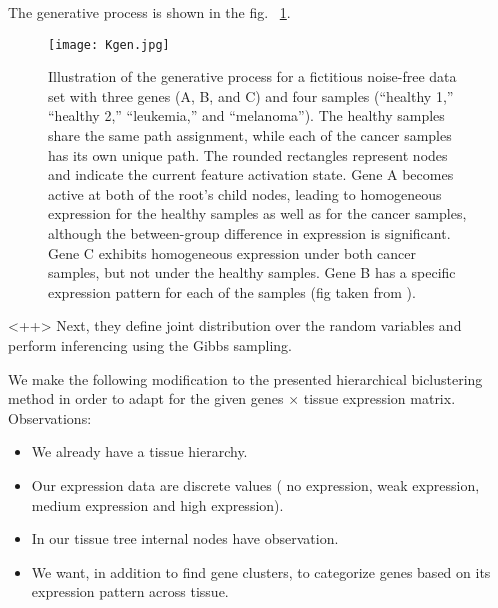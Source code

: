 \documentclass{article}
\begin{document}
The generative process is shown in the fig. ~\ref{fig:Kgen}.

\begin{figure}[ht]
	\begin{center}
		\texttt{[image: Kgen.jpg]}
	\end{center}
	\caption{Illustration of the generative process for a fictitious noise-free data set with three genes (A, B, and C) and four samples (“healthy 1,” “healthy 2,” “leukemia,” and “melanoma”). The healthy samples share the same path assignment, while each of the cancer samples has its own unique path. The rounded rectangles represent nodes and indicate the current feature activation state. Gene A becomes active at both of the root's child nodes, leading to homogeneous expression for the healthy samples as well as for the cancer samples, although the between-group difference in expression is significant. Gene C exhibits homogeneous expression under both cancer samples, but not under the healthy samples. Gene B has a specific expression pattern for each of the samples (fig taken from \cite{Kaski2010}).}
	\label{fig:Kgen}
\end{figure}<++>
Next, they define joint distribution over the random variables and perform inferencing using the Gibbs
sampling.

\par We make the following modification to the presented hierarchical biclustering method in order to adapt for the given genes $\times$ tissue expression matrix. Observations:
\begin{itemize}
	\item We already have a tissue hierarchy.
	\item Our expression data are discrete values ( no expression, weak expression, medium expression and
		high expression).
	\item In our tissue tree internal nodes have observation.
	\item We want, in addition to find gene clusters, to categorize genes based on its expression pattern 
		across tissue.
\end{itemize}
\end{document}
